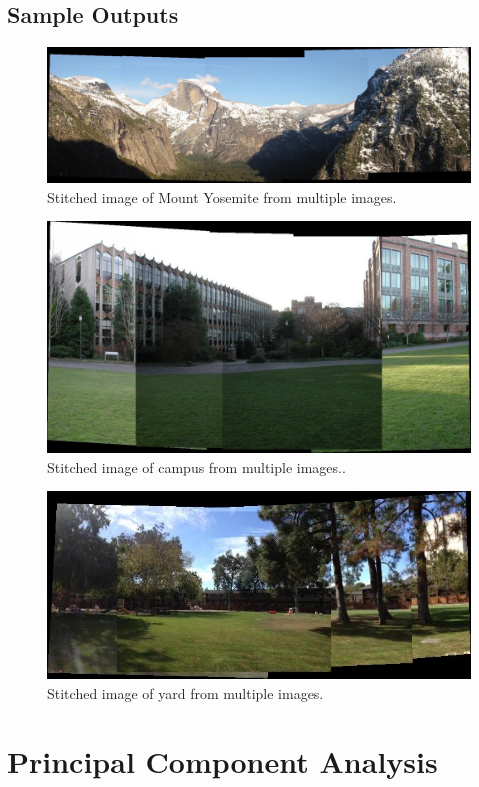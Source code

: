 \documentclass{article}
\begin{document}
\newpage

\subsection{Sample Outputs}
\begin{figure}[!htb]
  \centering
  \includegraphics[width=.99\textwidth]{yosemite_pano.jpg}
  \caption{Stitched image of Mount Yosemite from multiple images.}
\end{figure}%
\begin{figure}[!htb]
  \centering
  \includegraphics[width=.99\textwidth]{campus_pano.jpg}
  \caption{Stitched image of campus from multiple images..}
\end{figure}%
\newpage
\begin{figure}[!htb]
  \centering
  \includegraphics[width=.99\textwidth]{yard_pano.jpg}
  \caption{Stitched image of yard from multiple images.}
\end{figure}%
\section{Principal Component Analysis}
\end{document}
